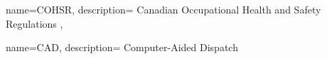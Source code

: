 {
  name={COHSR},
  description={
    Canadian Occupational Health and Safety Regulations
  },
}

{
  name={CAD},
  description={
    Computer-Aided Dispatch
  }
}

